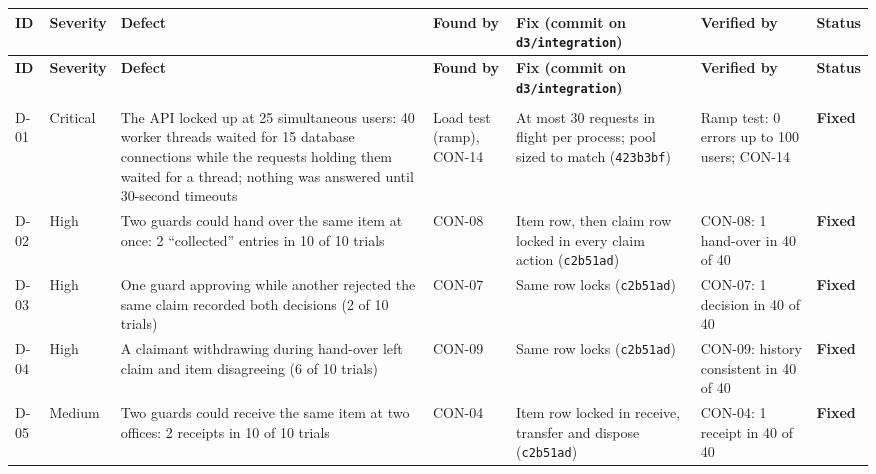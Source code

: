 {\footnotesize\setlength{\tabcolsep}{4pt}
\begin{longtable}{@{}>{\raggedright\arraybackslash}p{}>{\raggedright\arraybackslash}p{}>{\raggedright\arraybackslash}p{}>{\raggedright\arraybackslash}p{}>{\raggedright\arraybackslash}p{}>{\raggedright\arraybackslash}p{}>{\raggedright\arraybackslash}p{}@{}}
\toprule
\textbf{ID} & \textbf{Severity} & \textbf{Defect} & \textbf{Found by} & \textbf{Fix (commit on \texttt{d3/\allowbreak{}integration})} & \textbf{Verified by} & \textbf{Status} \\
\midrule
\endfirsthead
\toprule
\textbf{ID} & \textbf{Severity} & \textbf{Defect} & \textbf{Found by} & \textbf{Fix (commit on \texttt{d3/\allowbreak{}integration})} & \textbf{Verified by} & \textbf{Status} \\
\midrule
\endhead
\midrule\multicolumn{7}{r}{\scriptsize\itshape\color{soft}continued on the next page}\\
\endfoot
\bottomrule
\endlastfoot
D-01 & Critical & The API locked up at 25 simultaneous users: 40 worker threads waited for 15 database connections while the requests holding them waited for a thread; nothing was answered until 30-second timeouts & Load test (ramp), CON-14 & At most 30 requests in flight per process; pool sized to match (\texttt{423b3bf}) & Ramp test: 0 errors up to 100 users; CON-14 & \textcolor{found}{\textbf{Fixed}} \\
D-02 & High & Two guards could hand over the same item at once: 2 “collected” entries in 10 of 10 trials & CON-08 & Item row, then claim row locked in every claim action (\texttt{c2b51ad}) & CON-08: 1 hand-over in 40 of 40 & \textcolor{found}{\textbf{Fixed}} \\
D-03 & High & One guard approving while another rejected the same claim recorded both decisions (2 of 10 trials) & CON-07 & Same row locks (\texttt{c2b51ad}) & CON-07: 1 decision in 40 of 40 & \textcolor{found}{\textbf{Fixed}} \\
D-04 & High & A claimant withdrawing during hand-over left claim and item disagreeing (6 of 10 trials) & CON-09 & Same row locks (\texttt{c2b51ad}) & CON-09: history consistent in 40 of 40 & \textcolor{found}{\textbf{Fixed}} \\
D-05 & Medium & Two guards could receive the same item at two offices: 2 receipts in 10 of 10 trials & CON-04 & Item row locked in receive, transfer and dispose (\texttt{c2b51ad}) & CON-04: 1 receipt in 40 of 40 & \textcolor{found}{\textbf{Fixed}} \\

\end{longtable}}
